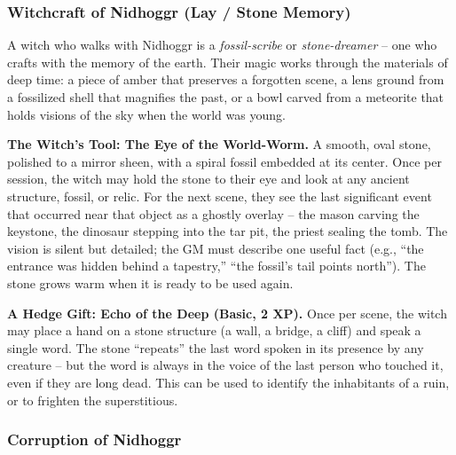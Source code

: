 \subsubsection*{Witchcraft of Nidhoggr (Lay / Stone Memory)}

A witch who walks with Nidhoggr is a \textit{fossil-scribe} or \textit{stone-dreamer} -- one who crafts with the memory of the earth. Their magic works through the materials of deep time: a piece of amber that preserves a forgotten scene, a lens ground from a fossilized shell that magnifies the past, or a bowl carved from a meteorite that holds visions of the sky when the world was young.

\textbf{The Witch's Tool: The Eye of the World-Worm.} A smooth, oval stone, polished to a mirror sheen, with a spiral fossil embedded at its center. Once per session, the witch may hold the stone to their eye and look at any ancient structure, fossil, or relic. For the next scene, they see the last significant event that occurred near that object as a ghostly overlay -- the mason carving the keystone, the dinosaur stepping into the tar pit, the priest sealing the tomb. The vision is silent but detailed; the GM must describe one useful fact (e.g., ``the entrance was hidden behind a tapestry,'' ``the fossil's tail points north''). The stone grows warm when it is ready to be used again.

\textbf{A Hedge Gift: Echo of the Deep (Basic, 2 XP).} Once per scene, the witch may place a hand on a stone structure (a wall, a bridge, a cliff) and speak a single word. The stone ``repeats'' the last word spoken in its presence by any creature -- but the word is always in the voice of the last person who touched it, even if they are long dead. This can be used to identify the inhabitants of a ruin, or to frighten the superstitious.

\subsubsection*{Corruption of Nidhoggr}

